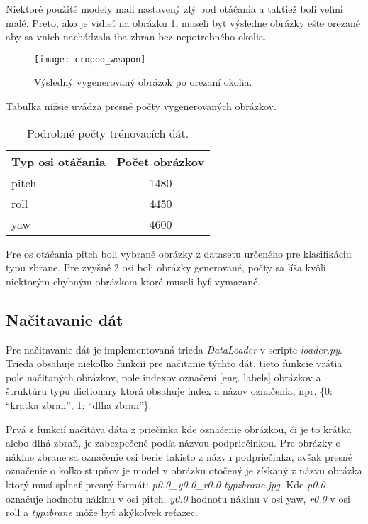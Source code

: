 Niektoré použité modely mali nastavený zlý bod otáčania a taktiež boli veľmi malé.
Preto, ako je vidieť na obrázku \ref{pic:generator3d}, museli byť výsledne obrázky ešte orezané aby sa vnich nachádzala iba zbran bez nepotrebného okolia.

\begin{figure}[H]
    \centering
    \texttt{[image: croped\_weapon]}
    \caption{Výsledný vygenerovaný obrázok po orezaní okolia.}
    \label{pic:generator3d}
\end{figure}

Tabuľka nižsie uvádza presné počty vygenerovaných obrázkov.

\begin{table}[H]
    \centering
    \label{my-label}
    \begin{tabular}{|l|c|}
        \hline
        Typ osi otáčania & \multicolumn{1}{l|}{Počet obrázkov} \\ \hline
        pitch            & 1480                                \\ \hline
        roll             & 4450                                \\ \hline
        yaw              & 4600                                \\ \hline
        \end{tabular}
    \caption{Podrobné počty trénovacích dát.}
\end{table}

Pre os otáčania pitch boli vybrané obrázky z datasetu určeného pre klasifikáciu typu zbrane.
Pre zvyšné 2 osi boli obrázky generované, počty sa líša kvôli niektorým chybným obrázkom ktoré museli byť vymazané.

\subsection{Načitavanie dát}
\label{subsec:nacitaniedat}
Pre načitavanie dát je implementovaná trieda \textit{DataLoader} v scripte \textit{loader.py}.
Trieda obsahuje niekoľko funkcií pre načitanie týchto dát, tieto funkcie vrátia pole načitaných obrázkov, pole indexov označení [eng. labels] obrázkov a
    štruktúru typu dictionary ktorá obsahuje index a názov označenia, npr. \{0: ``kratka zbran'', 1: ``dlha zbran''\}.

Prvá z funkcií načitáva dáta z priečinka kde označenie obrázkou, či je to krátka alebo dlhá zbraň, je zabezpečené podľa názvou podpriečinkou.
Pre obrázky o náklne zbrane sa označenie osi berie takisto z názvu podpriečinka, avšak presné označenie o koľko stupňov je model v obrázku otočený
    je získaný z názvu obrázka ktorý musí spĺnať presný formát: \textit{p0.0\_y0.0\_r0.0-typzbrane.jpg}.
Kde \textit{p0.0} označuje hodnotu náklnu v osi pitch, \textit{y0.0} hodnotu náklnu v osi yaw, \textit{r0.0} v osi roll a \textit{typzbrane} môže byť
    akýkoľvek reťazec.

